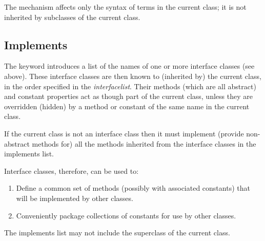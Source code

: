 The  mechanism affects only the syntax of terms in the
current class; it is not inherited by subclasses of the current class.
\subsection{Implements}
 
The  keyword introduces a list of the names of one or
more interface classes (see above).
These interface classes are then known to (inherited by) the current
class, in the order specified in the \emph{interfacelist}.
Their methods (which are all abstract) and constant properties act as
though part of the current class, unless they are overridden (hidden) by
a method or constant of the same name in the current class.
 
If the current class is not an interface class then it must implement
(provide non-abstract methods for) all the methods inherited from the
interface classes in the implements list.
 
Interface classes, therefore, can be used to:
\begin{enumerate}
\item Define a common set of methods (possibly with associated constants)
that will be implemented by other classes.
\item Conveniently package collections of constants for use by other
classes.
\end{enumerate}
 
The implements list may not include the superclass of the current class.
\index{,}
